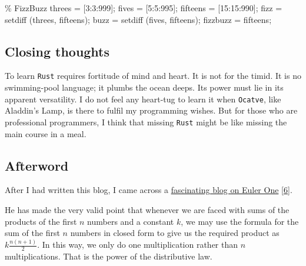 \documentclass[
  a4paper,
]{article}
\newenvironment{Shaded}{\begin{snugshade}}{\end{snugshade}}
\newcommand{\CommentTok}[1]{\textcolor[rgb]{0.50,0.62,0.50}{#1}}
\newcommand{\FloatTok}[1]{\textcolor[rgb]{0.75,0.75,0.82}{#1}}
\newcommand{\FunctionTok}[1]{\textcolor[rgb]{0.94,0.94,0.56}{#1}}
\newcommand{\NormalTok}[1]{\textcolor[rgb]{0.80,0.80,0.80}{#1}}
\newcommand{\OperatorTok}[1]{\textcolor[rgb]{0.94,0.94,0.82}{#1}}
\begin{document}
\begin{Shaded}
\begin{Highlighting}[]
\CommentTok{\% FizzBuzz}
\NormalTok{threes }\OperatorTok{=}\NormalTok{ [}\FloatTok{3}\OperatorTok{:}\FloatTok{3}\OperatorTok{:}\FloatTok{999}\NormalTok{]}\OperatorTok{;}
\NormalTok{fives }\OperatorTok{=}\NormalTok{ [}\FloatTok{5}\OperatorTok{:}\FloatTok{5}\OperatorTok{:}\FloatTok{995}\NormalTok{]}\OperatorTok{;}
\NormalTok{fifteens }\OperatorTok{=}\NormalTok{ [}\FloatTok{15}\OperatorTok{:}\FloatTok{15}\OperatorTok{:}\FloatTok{990}\NormalTok{]}\OperatorTok{;}
\NormalTok{fizz }\OperatorTok{=} \FunctionTok{setdiff}\NormalTok{ (threes}\OperatorTok{,}\NormalTok{ fifteens)}\OperatorTok{;}
\NormalTok{buzz }\OperatorTok{=} \FunctionTok{setdiff}\NormalTok{ (fives}\OperatorTok{,}\NormalTok{ fifteens)}\OperatorTok{;}
\NormalTok{fizzbuzz }\OperatorTok{=}\NormalTok{ fifteens}\OperatorTok{;}
\end{Highlighting}
\end{Shaded}

\hypertarget{closing-thoughts}{%
\subsection{Closing thoughts}\label{closing-thoughts}}

To learn \texttt{Rust} requires fortitude of mind and heart. It is not
for the timid. It is no swimming-pool language; it plumbs the ocean
deeps. Its power must lie in its apparent versatility. I do not feel any
heart-tug to learn it when \texttt{Ocatve}, like Aladdin's Lamp, is
there to fulfil my programming wishes. But for those who are
professional programmers, I think that missing \texttt{Rust} might be
like missing the main course in a meal.

\hypertarget{afterword}{%
\subsection{Afterword}\label{afterword}}

After I had written this blog, I came across a
\href{https://iambryanhaney.medium.com/another-unreasonable-deep-dive-into-project-euler-problem-1-51a3a841ad67\#:~:text=The\%20Problem,0\%20modulo\%203\%20or\%205}{fascinating
blog on Euler One} {[}\protect\hyperlink{ref-haney2020}{6}{]}.

He has made the very valid point that whenever we are faced with sums of
the products of the first \(n\) numbers and a constant \(k\), we may use
the formula for the sum of the first \(n\) numbers in closed form to
give us the required product as \(k\frac{n(n + 1)}{2}\). In this way, we
only do one multiplication rather than \(n\) multiplications. That is
the power of the distributive law.
\end{document}
